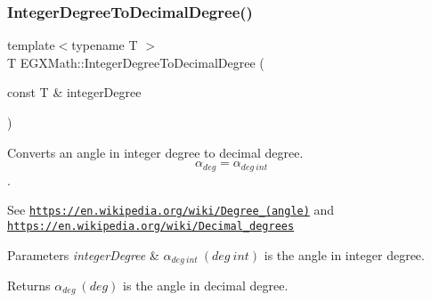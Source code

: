 \subsubsection{\texorpdfstring{Integer\+Degree\+To\+Decimal\+Degree()}{IntegerDegreeToDecimalDegree()}}
{\footnotesize\ttfamily template$<$typename T $>$ \\
T E\+G\+X\+Math\+::\+Integer\+Degree\+To\+Decimal\+Degree (\begin{DoxyParamCaption}\item[{const T \&}]{integer\+Degree }\end{DoxyParamCaption})}



Converts an angle in integer degree to decimal degree. \[\alpha_{deg}=\alpha_{deg\ int}\]. 

See \href{https://en.wikipedia.org/wiki/Degree_(angle)}{\tt https\+://en.\+wikipedia.\+org/wiki/\+Degree\+\_\+(angle)} and \href{https://en.wikipedia.org/wiki/Decimal_degrees}{\tt https\+://en.\+wikipedia.\+org/wiki/\+Decimal\+\_\+degrees} 
\begin{DoxyParams}{Parameters}
{\em integer\+Degree} & $\alpha_{deg\ int}\ (deg\ int)$ is the angle in integer degree. \\
\hline
\end{DoxyParams}
\begin{DoxyReturn}{Returns}
$\alpha_{deg}\ (deg)$ is the angle in decimal degree. 
\end{DoxyReturn}
